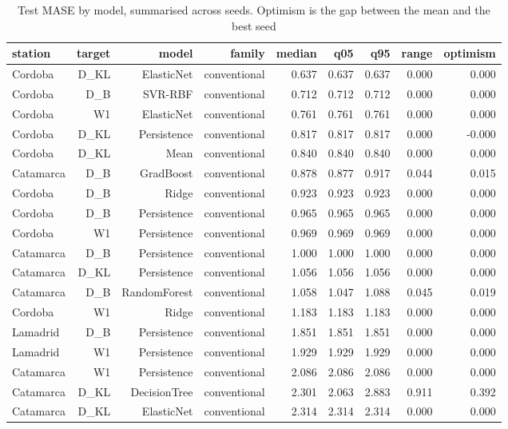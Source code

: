 \begin{table}[t]
\centering
\caption{Test MASE by model, summarised across seeds. Optimism is the gap between the mean and the best seed}
\label{tab:seeds}
\begin{tabular}{lrrrrrrrr}
\toprule
station & target & model & family & median & q05 & q95 & range & optimism \\
\midrule
Cordoba & D\_KL & ElasticNet & conventional & 0.637 & 0.637 & 0.637 & 0.000 & 0.000 \\
Cordoba & D\_B & SVR-RBF & conventional & 0.712 & 0.712 & 0.712 & 0.000 & 0.000 \\
Cordoba & W1 & ElasticNet & conventional & 0.761 & 0.761 & 0.761 & 0.000 & 0.000 \\
Cordoba & D\_KL & Persistence & conventional & 0.817 & 0.817 & 0.817 & 0.000 & -0.000 \\
Cordoba & D\_KL & Mean & conventional & 0.840 & 0.840 & 0.840 & 0.000 & 0.000 \\
Catamarca & D\_B & GradBoost & conventional & 0.878 & 0.877 & 0.917 & 0.044 & 0.015 \\
Cordoba & D\_B & Ridge & conventional & 0.923 & 0.923 & 0.923 & 0.000 & 0.000 \\
Cordoba & D\_B & Persistence & conventional & 0.965 & 0.965 & 0.965 & 0.000 & 0.000 \\
Cordoba & W1 & Persistence & conventional & 0.969 & 0.969 & 0.969 & 0.000 & 0.000 \\
Catamarca & D\_B & Persistence & conventional & 1.000 & 1.000 & 1.000 & 0.000 & 0.000 \\
Catamarca & D\_KL & Persistence & conventional & 1.056 & 1.056 & 1.056 & 0.000 & 0.000 \\
Catamarca & D\_B & RandomForest & conventional & 1.058 & 1.047 & 1.088 & 0.045 & 0.019 \\
Cordoba & W1 & Ridge & conventional & 1.183 & 1.183 & 1.183 & 0.000 & 0.000 \\
Lamadrid & D\_B & Persistence & conventional & 1.851 & 1.851 & 1.851 & 0.000 & 0.000 \\
Lamadrid & W1 & Persistence & conventional & 1.929 & 1.929 & 1.929 & 0.000 & 0.000 \\
Catamarca & W1 & Persistence & conventional & 2.086 & 2.086 & 2.086 & 0.000 & 0.000 \\
Catamarca & D\_KL & DecisionTree & conventional & 2.301 & 2.063 & 2.883 & 0.911 & 0.392 \\
Catamarca & D\_KL & ElasticNet & conventional & 2.314 & 2.314 & 2.314 & 0.000 & 0.000 \\

\end{tabular}
\end{table}
